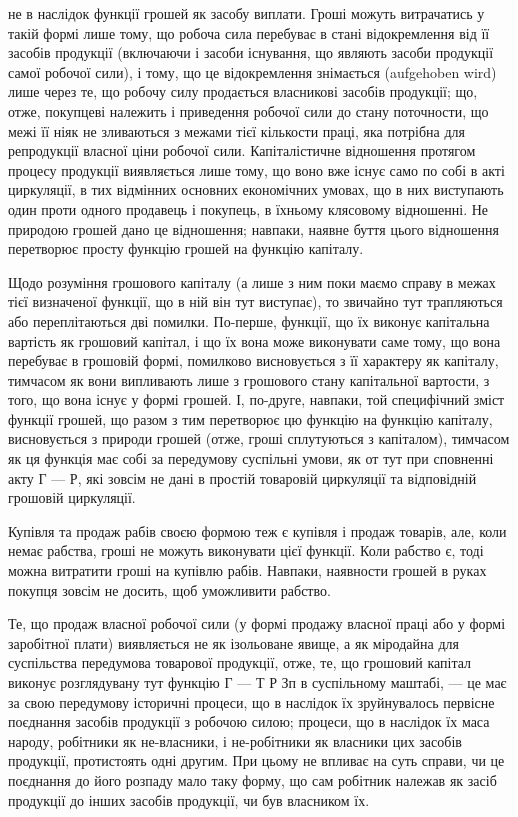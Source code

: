 не в наслідок функції грошей як засобу виплати. Гроші можуть витрачатись
у такій формі лише тому, що робоча сила перебуває в стані відокремлення
від її засобів продукції (включаючи і засоби існування, що являють
засоби продукції самої робочої сили), і тому, що це відокремлення
знімається (aufgehoben wird) лише через те, що робочу силу продається
власникові засобів продукції; що, отже, покупцеві належить і приведення
робочої сили до стану поточности, що межі її ніяк не зливаються з
межами тієї кількости праці, яка потрібна для репродукції власної ціни
робочої сили. Капіталістичне відношення протягом процесу продукції
виявляється лише тому, що воно вже існує само по собі
в акті циркуляції, в тих відмінних основних економічних умовах, що в
них виступають один проти одного продавець і покупець, в їхньому клясовому
відношенні. Не природою грошей дано це відношення; навпаки,
наявне буття цього відношення перетворює просту функцію грошей на
функцію капіталу.

Щодо розуміння грошового капіталу (а лише з ним поки маємо
справу в межах тієї визначеної функції, що в ній він тут виступає), то
звичайно тут трапляються або переплітаються дві помилки. По-перше,
функції, що їх виконує капітальна вартість як грошовий капітал, і що
їх вона може виконувати саме тому, що вона перебуває в грошовій
формі, помилково висновується з її характеру як капіталу, тимчасом як
вони випливають лише з грошового стану капітальної вартости, з того,
що вона існує у формі грошей. І, по-друге, навпаки, той специфічний
зміст функції грошей, що разом з тим перетворює цю функцію на функцію
капіталу, висновується з природи грошей (отже, гроші сплутуються
з капіталом), тимчасом як ця функція має собі за передумову
суспільні умови, як от тут при сповненні акту Г — Р, які зовсім не
дані в простій товаровій циркуляції та відповідній грошовій циркуляції.

Купівля та продаж рабів своєю формою теж є купівля і продаж
товарів, але, коли немає рабства, гроші не можуть виконувати
цієї функції. Коли рабство є, тоді можна витратити гроші на
купівлю рабів. Навпаки, наявности грошей в руках покупця зовсім не
досить, щоб уможливити рабство.

Те, що продаж власної робочої сили (у формі продажу власної праці
або у формі заробітної плати) виявляється не як ізольоване явище,
а як міродайна для суспільства передумова товарової продукції, отже,
те, що грошовий капітал виконує розглядувану тут функцію Г — Т Р Зп
в суспільному маштабі, — це має за свою передумову історичні процеси,
що в наслідок їх зруйнувалось первісне поєднання засобів продукції з
робочою силою; процеси, що в наслідок їх маса народу, робітники як
не-власники, і не-робітники як власники цих засобів продукції, протистоять
одні другим. При цьому не впливає на суть справи, чи це поєднання
до його розпаду мало таку форму, що сам робітник належав як засіб
продукції до інших засобів продукції, чи був власником їх.
